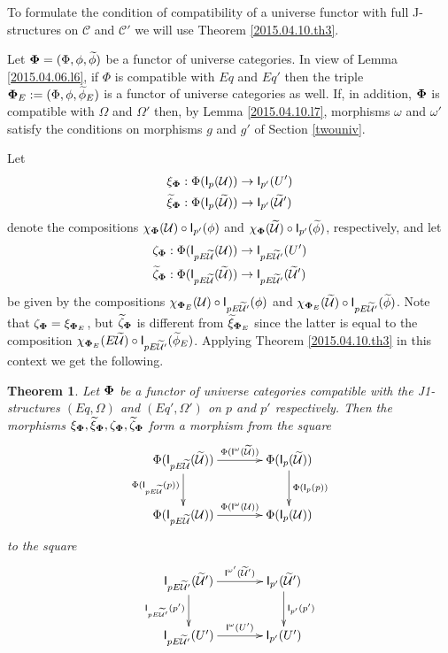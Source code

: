 \documentclass[12pt]{article}
\numberwithin{equation}{section}
\newtheorem{theorem}[proposition]{Theorem}
\newcommand{\llabel}[1]{\label{#1}}
\newcommand{\sr}{\rightarrow}
\newcommand{\wt}{\widetilde}
\newcommand{\C}{{\mathcal C}}  %
\newcommand{\U}{\mathcal{U}}
\newcommand{\I}{\mathsf{I}}
\begin{document}
To formulate the condition of compatibility of a universe functor with full
J-structures on $\C$ and $\C'$ we will use Theorem
\ref{2015.04.10.th3}.

Let ${\bf\Phi}=(\Phi,\phi,\wt{\phi})$ be a functor of universe categories. In
view of Lemma \ref{2015.04.06.l6}, if $\Phi$ is compatible with $Eq$ and $Eq'$
then the triple ${\bf\Phi}_{E}:=(\Phi,\phi,\wt{\phi}_{E})$ is a functor of
universe categories as well. If, in addition, ${\bf\Phi}$ is compatible with
$\Omega$ and $\Omega'$ then, by Lemma \ref{2015.04.10.l7}, morphisms $\omega$
and $\omega'$ satisfy the conditions on morphisms $g$ and $g'$ of Section
\ref{twouniv}.

Let
%
\begin{align*}
  \xi_{\bf\Phi}&:\Phi(\I_p(\U))\sr \I_{p'}(U') \\
  \wt{\xi}_{\bf\Phi}&:\Phi(\I_p(\wt{\U}))\sr \I_{p'}(\wt{\U}')
\end{align*}
%
denote the compositions $\chi_{\bf\Phi}(\U)\circ \I_{p'}(\phi)$ and
$\chi_{\bf\Phi}(\wt{\U})\circ \I_{p'}(\wt{\phi})$, respectively, and let
%
\begin{align*}
  \zeta_{\bf\Phi}&:\Phi(\I_{pE\wt{\U}}(\U))\sr \I_{pE\wt{\U}'}(U') \\
  \wt{\zeta}_{\bf\Phi}&:\Phi(\I_{pE\wt{\U}}(\wt{\U}))\sr \I_{pE\wt{\U}'}(\wt{\U}')
\end{align*}
%
be given by the compositions $\chi_{{\bf\Phi}_{E}}(\U)\circ \I_{pE\wt{\U}'}(\phi)$
and $\chi_{{\bf\Phi}_{E}}(\wt{\U})\circ \I_{pE\wt{\U}'}(\wt{\phi})$. Note that
$\zeta_{\bf\Phi}=\xi_{{\bf\Phi}_{E}}$, but $\wt{\zeta}_{\bf\Phi}$ is different
from $\wt{\xi}_{{\bf\Phi}_{E}}$ since the latter is equal to the composition
$\chi_{{\bf\Phi}_{E}}(E\wt{\U})\circ \I_{pE\wt{\U}'}(\wt{\phi}_{E})$. Applying
Theorem \ref{2015.04.10.th3} in this context we get the following.
%
\begin{theorem}
\llabel{2015.04.10.th1} Let ${\bf\Phi}$ be a functor of universe categories
compatible with the J1-structures $(Eq,\Omega)$ and $(Eq',\Omega')$ on $p$ and
$p'$ respectively. Then the morphisms $\xi_{\bf\Phi}, \wt{\xi}_{\bf\Phi},
\zeta_{\bf\Phi}, \wt{\zeta}_{\bf\Phi}$ form a morphism from the square
%
$$
\begin{xy}
          \xymatrix@C=3pc{ \Phi(\I_{pE\wt{\U}}(\wt{\U}))
            \ar[r]^-{\Phi(\I^{\omega}(\wt{\U}))} \ar[d]_{\Phi(\I_{pE\wt{\U}}(p))} &
            \Phi(\I_p(\wt{\U}))\ar[d]^-{\Phi(\I_p(p))}\\ \Phi(\I_{pE\wt{\U}}(\U))
            \ar[r]^-{\Phi(\I^{\omega}(\U))} & \Phi(\I_p(\U)) }
\end{xy}
$$
%
to the square
%
$$
\begin{xy}
          \xymatrix@C=3pc{ \I_{pE\wt{\U}'}(\wt{\U}')
            \ar[r]^-{\I^{\omega'}(\wt{\U}')} \ar[d]_-{\I_{pE\wt{\U}'}(p')} &
            \I_{p'}(\wt{\U}')\ar[d]^-{\I_{p'}(p')}\\ \I_{pE\wt{\U}'}(U')
            \ar[r]^-{\I^{\omega}(U')} & \I_{p'}(U') }
\end{xy}
$$
%
\end{theorem}
\end{document}
